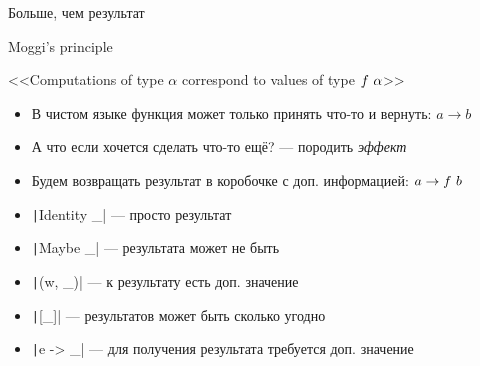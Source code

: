
    \begin{frame}[fragile]{Больше, чем результат \popslide}
        \begin{block}{Moggi's principle}
            \begin{center}
                \large
                \vspace{0.3em}
                <<Computations of type $\alpha$ correspond to values of type $f~\alpha$>>
                \vspace{0.3em}
            \end{center}
        \end{block}
        \begin{itemize}
            \item В чистом языке функция может только принять что-то и вернуть: $a\to b$
            \item А что если хочется сделать что-то ещё? --- породить \emph{эффект}
            \item Будем возвращать результат в коробочке с доп. информацией: $a\to f~ b$
            \item[\eg] \texttt|Identity _| --- просто результат
            \item[\eg] \texttt|Maybe _| --- результата может не быть
            \item[\eg] \texttt|(w, _)| --- к результату есть доп. значение
            \item[\eg] \texttt|[_]| --- результатов может быть сколько угодно
            \item[\eg] \texttt|e -> _| --- для получения результата требуется доп. значение
        \end{itemize}
    \end{frame}


